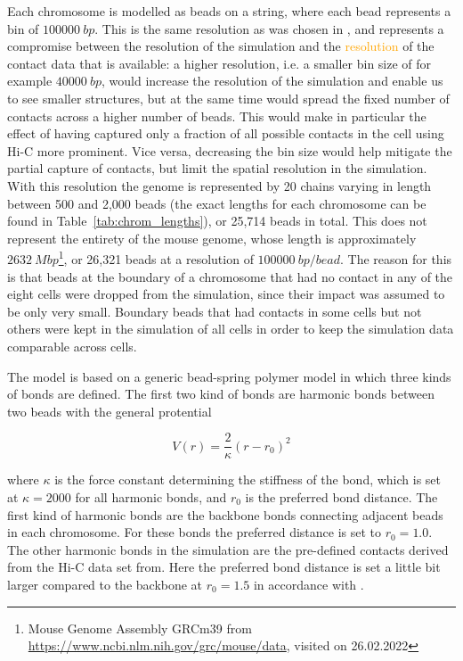 Each chromosome is modelled as beads on a string, where each bead represents a bin of \(\SI{100000}{bp}\). This is the same resolution as was chosen in \cite{wettermann_minimal_2020}, and represents a compromise between the resolution of the simulation and the \textcolor{orange}{resolution} of the contact data that is available: a higher resolution, i.e. a smaller bin size of for example \(\SI{40000}{bp}\), would increase the resolution of the simulation and enable us to see smaller structures, but at the same time would spread the fixed number of contacts across a higher number of beads. This would make in particular the effect of having captured only a fraction of all possible contacts in the cell using Hi-C more prominent. Vice versa, decreasing the bin size would help mitigate the partial capture of contacts, but limit the spatial resolution in the simulation. With this resolution the genome is represented by 20 chains varying in length between 500 and 2,000 beads (the exact lengths for each chromosome can be found in Table~\ref{tab:chrom_lengths}), or 25,714 beads in total. This does not represent the entirety of the mouse genome, whose length is approximately \(\SI{2632}{Mbp}\)\footnote{Mouse Genome Assembly GRCm39 from \url{https://www.ncbi.nlm.nih.gov/grc/mouse/data}, visited on 26.02.2022}, or 26,321 beads at a resolution of \(\SI{100000}{bp \per bead}\). The reason for this is that beads at the boundary of a chromosome that had no contact in any of the eight cells were dropped from the simulation, since their impact was assumed to be only very small. Boundary beads that had contacts in some cells but not others were kept in the simulation of all cells in order to keep the simulation data comparable across cells.

The model is based on a generic bead-spring polymer model in which three kinds of bonds are defined. The first two kind of bonds are harmonic bonds between two beads with the general protential

\[
  V(r) = \frac{2} \kappa \left( r - r_0 \right)^2
\]

where \(\kappa\) is the force constant determining the stiffness of the bond, which is set at \(\kappa = 2000\) for all harmonic bonds, and \(r_0\) is the preferred bond distance. The first kind of harmonic bonds are the backbone bonds connecting adjacent beads in each chromosome. For these bonds the preferred distance is set to \(r_0 = 1.0 \). The other harmonic bonds in the simulation are the pre-defined contacts derived from the Hi-C data set from\cite{stevens_3d_2017}. Here the preferred bond distance is set a little bit larger compared to the backbone at \(r_0 = 1.5\) in accordance with \cite{wettermann_minimal_2020}.

